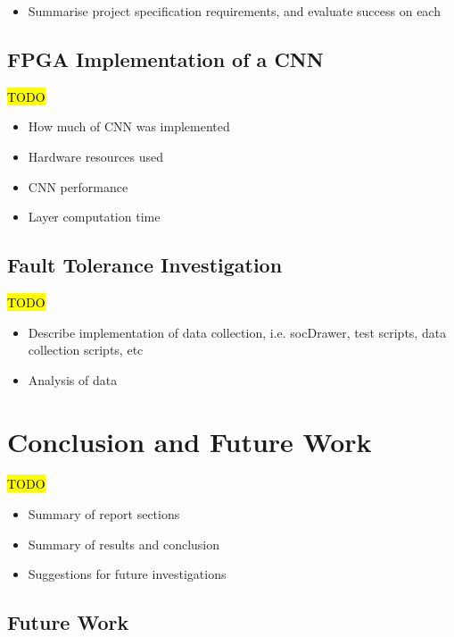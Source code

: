 \documentclass[12pt]{article}
\begin{document}
\begin{itemize}
\item Summarise project specification requirements, and evaluate success on each
\end{itemize}

\subsection{FPGA Implementation of a CNN}
\label{sec:Eval-FPGAImplOfCnn}

\hl{TODO}

\begin{itemize}
\item How much of CNN was implemented
\item Hardware resources used
\item CNN performance
\item Layer computation time
\end{itemize}

\subsection{Fault Tolerance Investigation}
\label{sec:Eval-FaultTolInv}

\hl{TODO}

\begin{itemize}
\item Describe implementation of data collection, i.e. socDrawer, test scripts, data collection scripts, etc
\item Analysis of data
\end{itemize}

\newpage

\section{Conclusion and Future Work}
\label{sec:Conclusion}

\hl{TODO}

\begin{itemize}
\item Summary of report sections
\item Summary of results and conclusion
\item Suggestions for future investigations
\end{itemize}

\subsection{Future Work}
\label{sec:Conclusion - FW}
\end{document}
